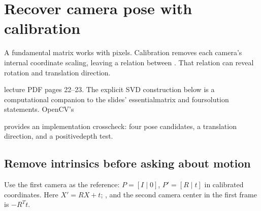 \documentclass[letterpaper,11pt,english,openany,oneside]{jupyterBook}
\begin{document}
\sphinxstepscope


\section{Recover camera pose with calibration}
\label{\detokenize{lectures/lecture04/essential:recover-camera-pose-with-calibration}}\label{\detokenize{lectures/lecture04/essential:lec04-essential}}\label{\detokenize{lectures/lecture04/essential::doc}}
\sphinxAtStartPar
A fundamental matrix works with pixels. Calibration removes each camera’s internal coordinate scaling, leaving a relation between . That relation can reveal rotation and translation direction.

\sphinxAtStartPar
{} lecture PDF pages 22–23. The explicit SVD construction below is a computational companion to the slides’ essential\sphinxhyphen{}matrix and four\sphinxhyphen{}solution statements. OpenCV’s %
\begin{footnote}[1]\sphinxAtStartFootnote
{}
%
\end{footnote} provides an implementation cross\sphinxhyphen{}check: four pose candidates, a translation direction, and a positive\sphinxhyphen{}depth test.

\ignorespaces
{}\ignorespaces
{}\ignorespaces

\subsection{Remove intrinsics before asking about motion}
\label{\detokenize{lectures/lecture04/essential:remove-intrinsics-before-asking-about-motion}}\label{\detokenize{lectures/lecture04/essential:index-2}}\label{\detokenize{lectures/lecture04/essential:index-1}}\label{\detokenize{lectures/lecture04/essential:index-0}}
\sphinxAtStartPar
Use the first camera as the reference: \(P=[I\mid0]\), \(P'=[R\mid t]\) in calibrated coordinates. Here \(X'=RX+t\); , and the second camera center in the first frame is \(-R^Tt\).
\end{document}
